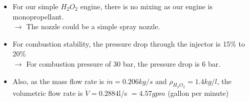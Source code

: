 \documentclass{beamer}
\begin{document}
\begin{frame}
    \begin{itemize}
    \item For our simple $H_2O_2$ engine, there is no mixing as our engine is monopropellant. \\
    $\rightarrow$ The nozzle could be a simple spray nozzle. \\
    \item For combustion stability, the pressure drop through the injector is 15\% to 20\% \\
    $\rightarrow$ For combustion pressure of 30 bar, the pressure drop is 6 bar.
    \item Also, as the mass flow rate is $\dot{m} = 0.206kg/s$ and $\rho_{H_2O_2} = 1.4kg/l$, the volumetric flow rate is $\dot{V} = 0.2884$l/s $= 4.57gpm$ (gallon per minute)\\
    \end{itemize}


\end{frame}
\end{document}
